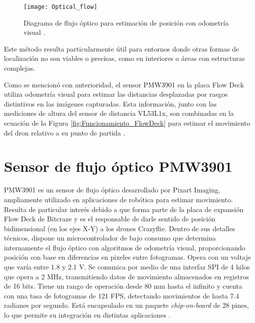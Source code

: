 \vspace{0.3cm} %
\begin{figure}[htbp]
	\centering
	\texttt{[image: Optical\_flow]}
	\caption{Diagrama de flujo óptico para estimación de posición con odometría visual \cite{Flujo_optico}.}
	\label{fig:Optical_flow}
\end{figure}

Este método resulta particularmente útil para entornos donde otras formas de localización no son viables o precisas, como en interiores o áreas con estructuras complejas. 

Como se mencionó con anterioridad, el sensor PMW3901 en la placa Flow Deck utiliza odometría visual para estimar las distancias desplazadas por rasgos distintivos en las imágenes capturadas. Esta información, junto con las mediciones de altura del sensor de distancia  VL53L1x, son combinadas en la ecuación de la Figura \ref{fig:Funcionamiento_FlowDeck} para estimar el movimiento del dron relativo a su punto de partida \cite{Funcionamiento_FlowDeck}.

 \section{Sensor de flujo óptico PMW3901}
PMW3901 es un sensor de flujo óptico desarrollado por Pixart Imaging, ampliamente utilizado en aplicaciones de robótica para estimar movimiento. Resulta de particular interés debido a que forma parte de la placa de expansión Flow Deck de Bitcraze y es el responsable de darle sentido de posición bidimensional (en los ejes X-Y) a los drones Crazyflie. Dentro de sus detalles técnicos, dispone un microcontrolador de bajo consumo que determina internamente el flujo óptico con algoritmos de odometría visual, proporcionando posición con base en diferencias en pixeles entre fotogramas. Opera con un voltaje que varía entre 1.8 y 2.1 V. Se comunica por medio de una interfaz SPI de 4 hilos que opera a 2 MHz, transmitiendo datos de movimiento almacenados en registros de 16 bits. Tiene un rango de operación desde 80 mm hasta el infinito y cuenta con una tasa de fotogramas de 121 FPS, detectando movimientos de hasta 7.4 radianes por segundo. Está encapsulado en un paquete \textit{chip-on-board} de 28 pines, lo que permite su integración en distintas aplicaciones \cite{PMW3901_datasheet}.


